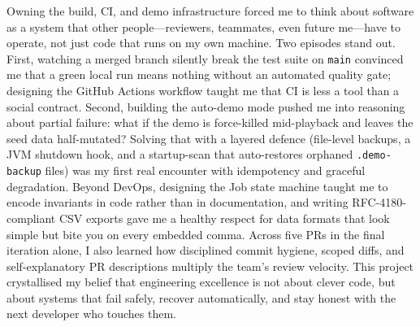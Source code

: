 \documentclass[12pt, a4paper]{article}
\begin{document}
Owning the build, CI, and demo infrastructure forced me to think about software as a system that other people---reviewers, teammates, even future me---have to operate, not just code that runs on my own machine. Two episodes stand out. First, watching a merged branch silently break the test suite on \texttt{main} convinced me that a green local run means nothing without an automated quality gate; designing the GitHub Actions workflow taught me that CI is less a tool than a social contract. Second, building the auto-demo mode pushed me into reasoning about partial failure: what if the demo is force-killed mid-playback and leaves the seed data half-mutated? Solving that with a layered defence (file-level backups, a JVM shutdown hook, and a startup-scan that auto-restores orphaned \texttt{.demo-backup} files) was my first real encounter with idempotency and graceful degradation. Beyond DevOps, designing the Job state machine taught me to encode invariants in code rather than in documentation, and writing RFC-4180-compliant CSV exports gave me a healthy respect for data formats that look simple but bite you on every embedded comma. Across five PRs in the final iteration alone, I also learned how disciplined commit hygiene, scoped diffs, and self-explanatory PR descriptions multiply the team's review velocity. This project crystallised my belief that engineering excellence is not about clever code, but about systems that fail safely, recover automatically, and stay honest with the next developer who touches them.
\end{document}
